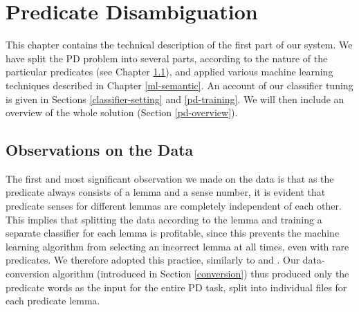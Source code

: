 \documentclass[12pt,notitlepage]{report}
\begin{document}
%
% 
\chapter{Predicate Disambiguation}\label{pd}
%
%

This chapter contains the technical description of the first part of our system. We have split the PD problem into several parts, according to the nature of the particular predicates (see Chapter \ref{pd-observe}), and applied various machine learning techniques described in Chapter \ref{ml-semantic}. An account of our classifier tuning is given in Sections \ref{classifier-setting} and \ref{pd-training}. We will then include an overview of the whole solution (Section \ref{pd-overview}).

\section{Observations on the Data}\label{pd-observe}

The first and most significant observation we made on the data is that as the predicate always consists of a lemma and a sense number, it is evident that predicate senses for different lemmas are completely independent of each other. This implies that splitting the data according to the lemma and training a separate classifier for each lemma is profitable, since this prevents the machine learning algorithm from selecting an incorrect lemma at all times, even with rare predicates. We therefore adopted this practice, similarly to \citet{che09} and \citet{nugues09}. Our data-conversion algorithm (introduced in Section \ref{conversion}) thus produced only the predicate words as the input for the entire PD task, split into individual files for each predicate lemma. 
\end{document}
